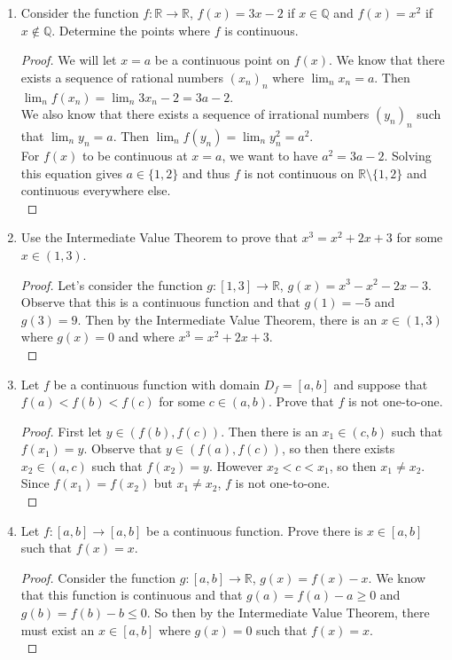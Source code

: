 \documentclass{article}
\begin{document}
\begin{enumerate}
        \item Consider the function $f : \mathbb{R} \to \mathbb{R}$, $f(x) = 3x-2$ if $x \in \mathbb{Q}$ and $f(x) = x^2$ if $x \notin \mathbb{Q}$. Determine the points where $f$ is continuous.
        \begin{proof}
            We will let $x=a$ be a continuous point on $f(x)$. We know that there exists a sequence of rational numbers $(x_n)_n$ where $\lim_n x_n = a$. Then $\lim_n f(x_n) =  \lim_n 3x_n-2 = 3a-2$.\\We also know that there exists a sequence of irrational numbers $(y_n)_n$ such that $\lim_n y_n = a$. Then $\lim_n f(y_n) = \lim_n y_n^2 = a^2$.\\
            For $f(x)$ to be continuous at $x=a$, we want to have $a^2=3a-2$. Solving this equation gives $a \in \{1,2\}$ and thus $f$ is not continuous on $\mathbb{R} \setminus \{1,2\}$ and continuous everywhere else.\\
        \end{proof}
        
        \item Use the Intermediate Value Theorem to prove that $x^3=x^2+2x+3$ for some $x \in (1,3)$.
        \begin{proof}
            Let's consider the function $g : [1,3] \to \mathbb{R}$, $g(x) = x^3-x^2-2x-3$. Observe that this is a continuous function and that $g(1) = -5$ and $g(3) = 9$. Then by the Intermediate Value Theorem, there is an $x \in (1,3)$ where $g(x) = 0$ and where $x^3=x^2+2x+3$.\\
        \end{proof}
        
        \item Let $f$ be a continuous function with domain $D_f = [a,b]$ and suppose that $f(a) < f(b) < f(c)$ for some $c \in (a,b)$. Prove that $f$ is not one-to-one.
        \begin{proof}
            First let $y \in (f(b), f(c))$. Then there is an $x_1 \in (c,b)$ such that $f(x_1)=y$. Observe that $y \in (f(a), f(c))$, so then there exists $x_2 \in (a,c)$ such that $f(x_2) = y$. However $x_2 < c < x_1$, so then $x_1 \neq x_2$. Since $f(x_1) = f(x_2)$ but $x_1 \neq x_2$, $f$ is not one-to-one.\\
        \end{proof}
        
        \item Let $f : [a,b] \to [a,b]$ be a continuous function. Prove there is $x \in [a,b]$ such that $f(x) = x$.\\
        \begin{proof}
            Consider the function $g : [a,b] \to \mathbb{R}$, $g(x) = f(x)-x$. We know that this function is continuous and that $g(a) = f(a)-a \geq 0$ and $g(b) = f(b) - b \leq 0$. So then by the Intermediate Value Theorem, there must exist an $x \in [a,b]$ where $g(x)=0$ such that $f(x)=x$.\\
        \end{proof}
    \end{enumerate}
\end{document}
